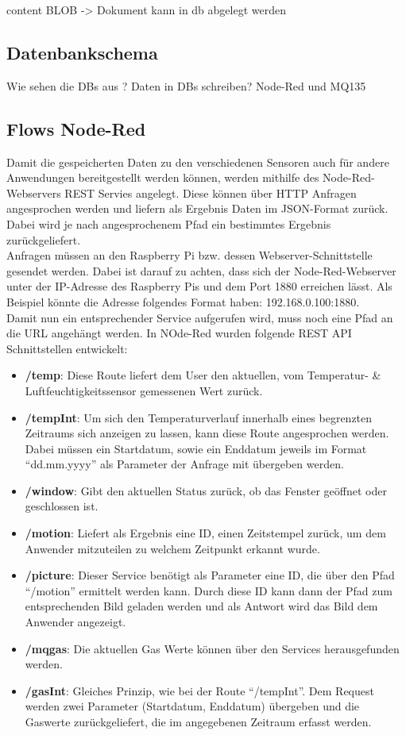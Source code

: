 content BLOB -> Dokument kann in db abgelegt werden


\subsection{Datenbankschema}
Wie sehen die DBs aus ?
Daten in DBs schreiben? Node-Red und MQ135

\subsection{Flows Node-Red}
Damit die gespeicherten Daten zu den verschiedenen Sensoren auch für andere Anwendungen bereitgestellt werden können, werden mithilfe des Node-Red-Webservers REST Servies angelegt. Diese können über \ac{HTTP} Anfragen angesprochen werden und liefern als Ergebnis Daten im \ac{JSON}-Format zurück. Dabei wird je nach angesprochenem Pfad ein bestimmtes Ergebnis zurückgeliefert. \\Anfragen müssen an den Raspberry Pi bzw. dessen Webserver-Schnittstelle gesendet werden. Dabei ist darauf zu achten, dass sich der Node-Red-Webserver unter der \ac{IP}-Adresse des Raspberry Pis und dem Port 1880 erreichen lässt. Als Beispiel könnte die Adresse folgendes Format haben: 192.168.0.100:1880. \\Damit nun ein entsprechender Service aufgerufen wird, muss noch eine Pfad an die \ac{URL} angehängt werden. In NOde-Red wurden folgende REST \ac{API} Schnittstellen entwickelt:
\begin{itemize}
	\item \textbf{/temp}: Diese Route liefert dem User den aktuellen, vom Temperatur- \& Luftfeuchtigkeitssensor gemessenen Wert zurück. 
	\item \textbf{/tempInt}: Um sich den Temperaturverlauf innerhalb eines begrenzten Zeitraums sich anzeigen zu lassen, kann diese Route angesprochen werden. Dabei müssen ein Startdatum, sowie ein Enddatum jeweils im Format \enquote{dd.mm.yyyy} als Parameter der Anfrage mit übergeben werden.
	\item \textbf{/window}: Gibt den aktuellen Status zurück, ob das Fenster geöffnet oder geschlossen ist.
	\item \textbf{/motion}: Liefert als Ergebnis eine ID, einen Zeitstempel zurück, um dem Anwender mitzuteilen zu welchem Zeitpunkt erkannt wurde.
	\item \textbf{/picture}: Dieser Service benötigt als Parameter eine ID, die über den Pfad \enquote{/motion} ermittelt werden kann. Durch diese ID kann dann der Pfad zum entsprechenden Bild geladen werden und als Antwort wird das Bild dem Anwender angezeigt.
	\item \textbf{/mqgas}: Die aktuellen Gas Werte können über den Services herausgefunden werden.
	\item \textbf{/gasInt}: Gleiches Prinzip, wie bei der Route \enquote{/tempInt}. Dem Request werden zwei Parameter (Startdatum, Enddatum) übergeben und die Gaswerte zurückgeliefert, die im angegebenen Zeitraum erfasst werden.
\end{itemize}

